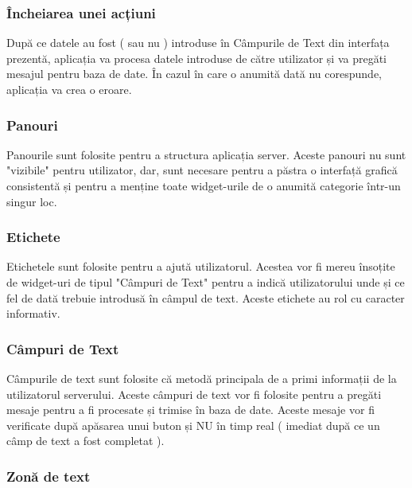 \documentclass{article}
\begin{document}
\subsubsection*{Încheiarea unei acțiuni}

	După ce datele au fost ( sau nu ) introduse în Câmpurile de Text din interfața prezentă, aplicația va procesa datele introduse de către utilizator și va pregăti mesajul pentru baza de date. În cazul în care o anumită dată nu corespunde, aplicația va crea o eroare.\\

\subsubsection{Panouri}

	Panourile sunt folosite pentru a structura aplicația server. Aceste panouri nu sunt "vizibile" pentru utilizator, dar, sunt necesare pentru a păstra o interfață grafică consistentă și pentru a
menține toate widget-urile de o anumită categorie într-un singur loc.\\

\subsubsection{Etichete}

	Etichetele sunt folosite pentru a ajută utilizatorul. Acestea vor fi mereu însoțite de widget-uri de tipul "Câmpuri de Text" pentru a indică utilizatorului unde și ce fel de dată trebuie introdusă în câmpul de text. Aceste etichete au rol cu caracter informativ.\\

\subsubsection{Câmpuri de Text}

	Câmpurile de text sunt folosite că metodă principala de a primi informații de la utilizatorul serverului. Aceste câmpuri de text vor fi folosite pentru a pregăti mesaje pentru a fi procesate și trimise în baza de date. Aceste mesaje vor fi verificate după apăsarea unui buton și NU în timp real ( imediat după ce un câmp de text a fost completat ).\\

\subsubsection{Zonă de text}
\end{document}

